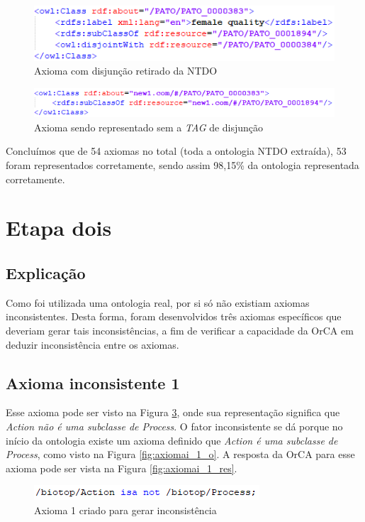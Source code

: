\documentclass{bcc}
\begin{document}
\begin{figure}[H]
\centering
\includegraphics[width=.8\textwidth]{Figuras/axiomae_o.png}
\caption{Axioma com disjunção retirado da NTDO} 
\label{fig:axiomae_o}
\end{figure}

\begin{figure}[H]
\centering
\includegraphics[width=.8\textwidth]{Figuras/axiomae_orca.png}
\caption{Axioma sendo representado sem a \textit{TAG} de disjunção} 
\label{fig:axiomae_orca}
\end{figure}

Concluímos que de 54 axiomas no total (toda a ontologia NTDO extraída), 53 foram representados corretamente, sendo assim 98,15\% da ontologia representada corretamente.

\section{Etapa dois}
\subsection{Explicação}
Como foi utilizada uma ontologia real, por si só não existiam axiomas inconsistentes. Desta forma, foram desenvolvidos três axiomas específicos que deveriam gerar tais inconsistências, a fim de verificar a capacidade da OrCA em deduzir inconsistência entre os axiomas. 

\subsection{Axioma inconsistente 1}
Esse axioma pode ser visto na Figura \ref{fig:axiomai_1}, onde sua representação significa que \textit{Action não é uma subclasse de Process}. O fator inconsistente se dá porque no início da ontologia existe um axioma definido que \textit{Action é uma subclasse de Process}, como visto na Figura \ref{fig:axiomai_1_o}. A resposta da OrCA para esse axioma pode ser vista na Figura \ref{fig:axiomai_1_res}.

\begin{figure}[H]
\centering
\includegraphics[width=.5\textwidth]{Figuras/axiomai_1.png}
\caption{Axioma 1 criado para gerar inconsistência} 
\label{fig:axiomai_1}
\end{figure}
\end{document}
